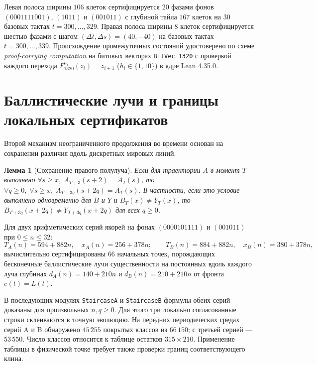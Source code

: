 \documentclass[11pt, a4paper]{article}
\newtheorem{lemma}[theorem]{Лемма}
\begin{document}
Левая полоса ширины $106$ клеток сертифицируется $20$ фазами фонов $(0001111001)$, $(1011)$ и $(001011)$ с глубиной тайла $167$ клеток на $30$ базовых тактах $t = 300, \dots, 329$. Правая полоса ширины $8$ клеток сертифицируется шестью фазами с шагом $(\Delta t, \Delta s) = (40,-40)$ на базовых тактах $t = 300, \dots, 339$. Происхождение промежуточных состояний удостоверено по схеме \emph{proof-carrying computation} на битовых векторах \texttt{BitVec 1320} с проверкой каждого перехода $F_{1320}^{h_i}(z_i) = z_{i+1}$ ($h_i \in \{1, 10\}$) в ядре Lean 4.35.0.

\section{Баллистические лучи и границы локальных сертификатов}

Второй механизм неограниченного продолжения во времени основан на сохранении различия вдоль дискретных мировых линий.

\begin{lemma}[Сохранение правого полулуча]\label{lem:ballistic_ray}
Если для траектории $A$ в момент $T$ выполнено $\forall s \ge x,\; A_{T+3}(s + 2) = A_T(s)$, то $\forall q \ge 0,\; \forall s \ge x,\; A_{T+3q}(s + 2q) = A_T(s)$. В частности, если это условие выполнено одновременно для $B$ и $Y$ и $B_T(x) \ne Y_T(x)$, то $B_{T+3q}(x + 2q) \ne Y_{T+3q}(x + 2q)$ для всех $q \ge 0$.
\end{lemma}

Для двух арифметических серий якорей на фонах $(0000101111)$ и $(001011)$ при $0 \le n \le 32$:
\begin{equation}
T_A(n) = 594 + 882n,\quad x_A(n) = 256 + 378n; \qquad
T_B(n) = 884 + 882n,\quad x_B(n) = 380 + 378n,
\end{equation}
вычислительно сертифицированы $66$ начальных точек, порождающих бесконечные баллистические лучи существенности на постоянных вдоль каждого луча глубинах $d_A(n) = 140 + 210n$ и $d_B(n) = 210 + 210n$ от фронта $e(t) = L(t)$.

В последующих модулях \texttt{StaircaseA} и \texttt{StaircaseB} формулы обеих серий доказаны для произвольных $n,q\ge0$. Для этого три локально согласованные строки склеиваются в точную эволюцию. На передних периодических средах серий A и B обнаружено $45\,255$ покрытых классов из $66\,150$; с третьей серией --- $53\,550$. Число классов относится к таблице остатков $315\times210$. Применение таблицы в физической точке требует также проверки границ соответствующего клина.
\end{document}
